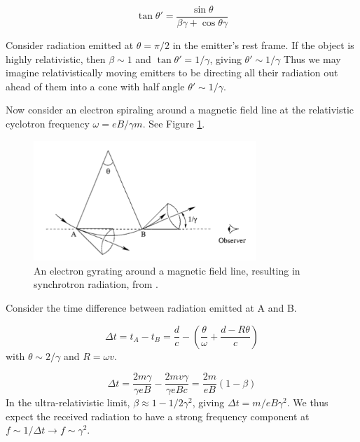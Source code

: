 \begin{equation}
\tan\theta'=\frac{\sin\theta}{\beta\gamma+\cos\theta\gamma}
\end{equation}

Consider radiation emitted at $\theta=\pi/2$ in the emitter's rest frame. If the object is highly relativistic, then $\beta\sim1$ and $\tan\theta'=1/\gamma$, giving $\theta'\sim1/\gamma$ Thus we may imagine relativistically moving emitters to be directing all their radiation out ahead of them into a cone with half angle $\theta'\sim1/\gamma$. 

Now consider an electron spiraling around a magnetic field line at the relativistic cyclotron frequency $\omega=eB/\gamma m$. See Figure \ref{fig:synchrotrondiagram}. 

\begin{figure}[h]
    \centering
    \includegraphics[width=0.75\textwidth]{chap0_intro/synchrotrondiagram.png}
    \caption[Diagram of electron gyration around a magnetic field line, resulting in synchrotron radiation.]{An electron gyrating around a magnetic field line, resulting in synchrotron radiation, from \citet{choudhuri2010astrophysics}.}
    \label{fig:synchrotrondiagram}
\end{figure}

Consider the time difference between radiation emitted at A and B. 

\begin{equation}
\Delta t=t_A-t_B=\frac{d}{c}-\left(\frac{\theta}{\omega}+\frac{d-R\theta}{c}\right)
\end{equation}
with $\theta\sim2/\gamma$ and $R=\omega v$. 

\begin{equation}
\Delta t = \frac{2m\gamma}{\gamma e B}-\frac{2mv\gamma}{\gamma eB c}=\frac{2m}{eB}(1-\beta)
\end{equation}
In the ultra-relativistic limit, $\beta\approx1-1/2\gamma^2$, giving $\Delta t=m/eB\gamma^2$. We thus expect the received radiation to have a strong frequency component at $f\sim1/\Delta t\to f\sim\gamma^2$. 

